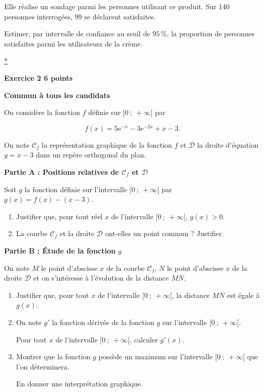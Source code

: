 \documentclass[10pt]{article}
\begin{document}
Elle réalise un sondage parmi les personnes utilisant ce produit. Sur $140$~ personnes interrogées, $99$ se déclarent satisfaites.
 
Estimer, par intervalle de confiance au seuil de $95$\,\%, la proportion de personnes satisfaites parmi les utilisateurs de la crème.

\hyperlink{Index}{*} 

\vspace{0,5cm}

\textbf{Exercice 2 \hfill  6 points}

\textbf{Commun à  tous les candidats}

\medskip

On considère la fonction $f$ définie sur $[0~;~+\infty[$ par 

\[f(x) = 5 \text{e}^{-x} - 3\text{e}^{-2x} + x - 3.\]
 
On note $\mathcal{C}_{f}$ la représentation graphique de la fonction $f$ et $\mathcal{D}$ la droite d'équation $y = x - 3$  dans un repère orthogonal du plan.

\medskip
 
\textbf{Partie A : Positions relatives de \boldmath$\mathcal{C}_{f}$ et $\mathcal{D}$\unboldmath}

\medskip
 
Soit $g$ la fonction définie sur l'intervalle $[0~;~+\infty[$ par $g(x) = f(x) - (x - 3)$.

\medskip
 
\begin{enumerate}
\item Justifier que, pour tout réel $x$ de l'intervalle $[0~;~+\infty[$, \:$g(x) > 0$. 
\item La courbe $\mathcal{C}_{f}$ et la droite $\mathcal{D}$ ont-elles un point commun ? Justifier.
\end{enumerate}

\bigskip
 
\textbf{Partie B : Étude de la fonction }\boldmath $g$ \unboldmath

\medskip
 
On note $M$ le point d'abscisse $x$ de la courbe $\mathcal{C}_{f}$,  $N$ le point d'abscisse $x$ de la droite $\mathcal{D}$ et on s'intéresse à l'évolution de la distance $MN$.

\medskip
 
\begin{enumerate}
\item Justifier que, pour tout $x$ de l'intervalle $[0~;~+\infty[$, la distance $MN$ est égale à $g(x)$. 
\item On note $g'$ la fonction dérivée de la fonction $g$ sur l'intervalle $[0~;~+\infty[$.
 
Pour tout $x$ de l'intervalle $[0~;~+\infty[$, calculer $g'(x)$. 
\item Montrer que la fonction $g$ possède un maximum sur l'intervalle $[0~;~+\infty[$ que l'on déterminera.
 
En donner une interprétation graphique.
\end{enumerate}
\end{document}
